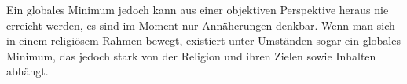 \documentclass[12pt,a4paper,oneside]{article}
\begin{document}
  Ein globales Minimum jedoch kann aus einer objektiven Perspektive heraus nie erreicht werden, es sind im Moment nur Annäherungen denkbar. Wenn man sich in einem religiösem Rahmen bewegt, existiert unter Umständen sogar ein globales Minimum, das jedoch stark von der Religion und ihren Zielen sowie Inhalten abhängt. \\
  
\end{document}
